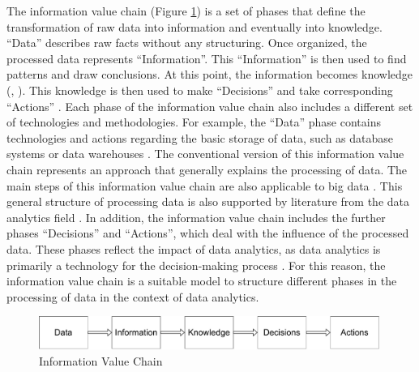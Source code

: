 The information value chain (Figure \ref{information_value_chain}) is a set of phases that define the transformation of raw data into information and eventually into knowledge. \enquote{Data} describes raw facts without any structuring. Once organized, the processed data represents \enquote{Information}. This \enquote{Information} is then used to find patterns and draw conclusions. At this point, the information becomes knowledge (\cite{Fayyad.1996}, \cite{Fayyad.1996b}). This knowledge is then used to make \enquote{Decisions} and take corresponding \enquote{Actions} \parencite{Sharma.2014}. Each phase of the information value chain also includes a different set of technologies and methodologies. For example, the \enquote{Data} phase contains technologies and actions regarding the basic storage of data, such as database systems or data warehouses \parencite{Abbasi.2016}. The conventional version of this information value chain represents an approach that generally explains the processing of data. The main steps of this information value chain are also applicable to big data \parencite{Abbasi.2016}. This general structure of processing data is also supported by literature from the data analytics field \parencite{Runkler.2020}. In addition, the information value chain includes the further phases \enquote{Decisions} and \enquote{Actions}, which deal with the influence of the processed data. These phases reflect the impact of data analytics, as data analytics is primarily a technology for the decision-making process \parencite{Runkler.2020}. For this reason, the information value chain is a suitable model to structure different phases in the processing of data in the context of data analytics.

\begin{figure}[htbp]
    \includegraphics[width=0.99\textwidth, keepaspectratio]{content/02_theretical_foundations/informationValueChain.pdf}
    \caption{Information Value Chain}    
    \label{information_value_chain}
\end{figure}


